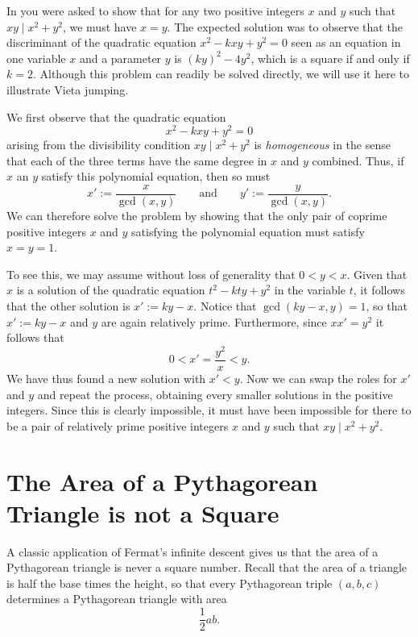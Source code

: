 \begin{example}
  In  you were asked to show that for any two positive integers $x$ and $y$ such that $xy\mid x^2+y^2$, we must have $x=y$. The expected solution was to observe that the discriminant of the quadratic equation $x^2-kxy+y^2=0$ seen as an equation in one variable $x$ and a parameter $y$ is $(ky)^2-4y^2$, which is a square if and only if $k=2$. Although this problem can readily be solved directly, we will use it here to illustrate Vieta jumping.

  We first observe that the quadratic equation
  \begin{equation*}
    x^2-kxy + y^2=0
  \end{equation*}
  arising from the divisibility condition $xy\mid x^2+y^2$ is \emph{homogeneous} in the sense that each of the three terms have the same degree in $x$ and $y$ combined. Thus, if $x$ an $y$ satisfy this polynomial equation, then so must
  \begin{equation*}
    x' :=\frac{x}{\gcd(x,y)}\qquad\text{and}\qquad y':=\frac{y}{\gcd(x,y)}.
  \end{equation*}
  We can therefore solve the problem by showing that the only pair of coprime positive integers $x$ and $y$ satisfying the polynomial equation must satisfy $x=y=1$.

  To see this, we may assume without loss of generality that $0<y<x$. Given that $x$ is a solution of the quadratic equation $t^2-kty+y^2$ in the variable $t$, it follows that the other solution is $x':=ky-x$. Notice that $\gcd(ky-x,y)=1$, so that $x':=ky-x$ and $y$ are again relatively prime. Furthermore, since $xx'=y^2$ it follows that
  \begin{equation*}
    0<x'=\frac{y^2}{x}<y.
  \end{equation*}
  We have thus found a new solution with $x'<y$. Now we can swap the roles for $x'$ and $y$ and repeat the process, obtaining every smaller solutions in the positive integers. Since this is clearly impossible, it must have been impossible for there to be a pair of relatively prime positive integers $x$ and $y$ such that $xy\mid x^2+y^2$.
\end{example}

\section{The Area of a Pythagorean Triangle is not a Square}

A classic application of Fermat's infinite descent gives us that the area of a Pythagorean triangle is never a square number. Recall that the area of a triangle is half the base times the height, so that every Pythagorean triple $(a,b,c)$ determines a Pythagorean triangle with area
\begin{equation*}
  \frac{1}{2}ab.
\end{equation*}

